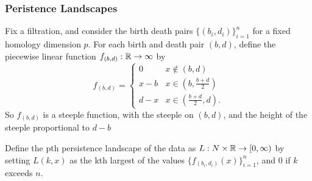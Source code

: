 
\subsubsection{Peristence Landscapes}

Fix a filtration, and consider the birth death pairs $\{(b_i, d_i)\}_{i=1}^n$ for a fixed homology dimension $p$. For each birth and death pair $(b, d)$, define the piecewise linear function $f_{(b, d)}: \mathbb{R} \rightarrow \infty$ by
$$
f_{(b, d)} = \begin{cases}
                0 & x \not\in (b, d) \\
                x - b & x \in (b, \frac{b + d}{2}) \\
                d - x & x \in (\frac{b + d}{2}, d).
             \end{cases}
$$
So $f_{(b, d)}$ is a steeple function, with the steeple on $(b, d)$, and the height of the steeple proportional to $d - b$

Define the pth persistence landscape of the data as $L: N \times \mathbb{R} \rightarrow [0, \infty)$ by setting $L(k, x)$ as the kth largest of the values $\{f_{(b_i, d_i)}(x)\}_{i=1}^n$, and $0$ if $k$ exceeds $n$.

